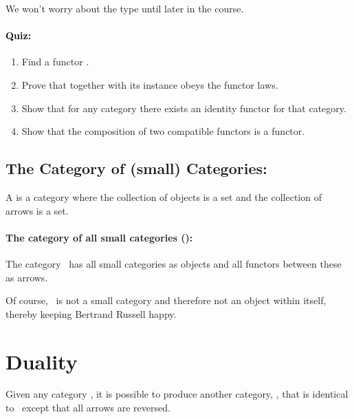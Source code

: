 \documentclass{seminar}
\newcommand{\Ha}{\tmi{Hask}}
\newcommand{\vs}{\vspace{0.3in}}
\newcommand{\CC}{\tm{\cal C}}
\newcommand{\COP}{\tm{\cal C^\mathrm{op}}}
\begin{document}
\begin{slide}
We won't worry about the  type until later in the course.

\newslide

\paragraph{\textcolor{black}{Quiz:}}

\color{QuoteColor}
\begin{enumerate}
\item Find a functor \tm{G: \Ha \rightarrow \one}.
\item Prove that  together with its  instance
obeys
the functor laws.
\item Show that for any category there exists an identity functor
for that category.
\item Show that the composition of two compatible functors is a
functor.
\end{enumerate}
\color{black}

\newslide

\subsection*{The Category of ({\small small}) Categories:}

A  is a category where the collection
of objects
is a set and the collection of arrows is a set.

\vs

\paragraph{The category of all small categories ():}
The category \, has all small categories as objects and
all functors
between these as arrows.

\vs

Of course, \, is not a small category and therefore not
an object
within itself, thereby keeping Bertrand Russell happy.

\newslide

\section*{Duality}

Given any category \CC, it is possible to produce another category,
\COP, that is identical to \CC \, except that all arrows are reversed.


\end{slide}
\end{document}
